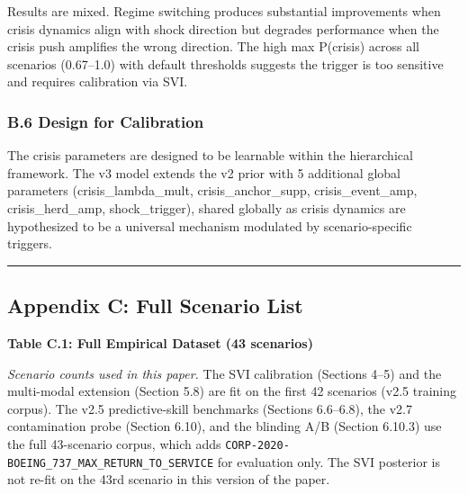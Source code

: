 \documentclass[
]{article}
\begin{document}
Results are mixed. Regime switching produces substantial improvements
when crisis dynamics align with shock direction but degrades performance
when the crisis push amplifies the wrong direction. The high max
P(crisis) across all scenarios (0.67--1.0) with default thresholds
suggests the trigger is too sensitive and requires calibration via SVI.

\subsubsection{B.6 Design for
Calibration}\label{b.6-design-for-calibration}

The crisis parameters are designed to be learnable within the
hierarchical framework. The v3 model extends the v2 prior with 5
additional global parameters (crisis\_lambda\_mult,
crisis\_anchor\_supp, crisis\_event\_amp, crisis\_herd\_amp,
shock\_trigger), shared globally as crisis dynamics are hypothesized to
be a universal mechanism modulated by scenario-specific triggers.

\begin{center}\rule{0.5\linewidth}{0.5pt}\end{center}

\subsection{Appendix C: Full Scenario
List}\label{appendix-c-full-scenario-list}

\textbf{Table C.1: Full Empirical Dataset (43 scenarios)}

\emph{Scenario counts used in this paper.} The SVI calibration (Sections
4--5) and the multi-modal extension (Section 5.8) are fit on the first
42 scenarios (v2.5 training corpus). The v2.5 predictive-skill
benchmarks (Sections 6.6--6.8), the v2.7 contamination probe (Section
6.10), and the blinding A/B (Section 6.10.3) use the full 43-scenario
corpus, which adds
\texttt{CORP-2020-BOEING\_737\_MAX\_RETURN\_TO\_SERVICE} for evaluation
only. The SVI posterior is not re-fit on the 43rd scenario in this
version of the paper.
\end{document}
